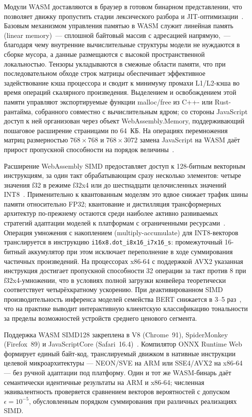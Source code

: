 Модули WASM доставляются в браузер в готовом бинарном представлении, что позволяет движку пропустить стадии лексического разбора и JIT-оптимизации~\cite{jia2024empowering}. Базовым механизмом управления памятью в WASM служит линейная память (linear memory)~— сплошной байтовый массив с адресацией напрямую,~— благодаря чему внутренние вычислительные структуры модели не нуждаются в сборке мусора, а данные размещаются с высокой пространственной локальностью. Тензоры укладываются в смежные области памяти, что при последовательном обходе строк матрицы обеспечивает эффективное задействование кэша процессора и сводит к минимуму промахи L1/L2-кэша во время операций скалярного произведения. Выделением и освобождением этой памяти управляют экспортируемые функции malloc/free из C++- или Rust-рантайма, собранного совместно с вычислительным ядром; со стороны JavaScript доступ к ней организован через объект WebAssembly.Memory, поддерживающий пошаговое расширение страницами по 64~КБ. На операциях перемножения матриц размерностью $768 \times 768$ и $768 \times 3072$ замена JavaScript на WASM даёт прирост пропускной способности на порядок величины~\cite{wang2024anatomizing}.

Расширение WebAssembly SIMD предоставляет доступ к 128-битным векторным инструкциям, за один такт обрабатывающим сразу несколько элементов: четыре значения f32 в режиме f32x4 или до шестнадцати целочисленных значений INT8~\cite{wang2024anatomizing, gholami2021quantization}. Применительно к квантованным моделям это вдвое снижает трафик шины памяти относительно FP32; квантование и дистилляция трансформерных архитектур по-прежнему остаются среди наиболее активно развиваемых стратегий адаптации моделей к платформам с ограниченными ресурсами~\cite{tang2024transformer}. Операция умножения с накоплением (multiply-accumulate) для INT8-векторов транслируется в инструкцию \texttt{i16x8.dot\_i8x16\_i7x16\_s}: промежуточный 16-битный аккумулятор при этом исключает переполнение в ходе суммирования частичных произведений. На процессорах x86-64 с поддержкой AVX2 указанная инструкция достигает пропускной способности 32 операции за такт против 8 при f32x4-умножении, что в условиях полной загрузки конвейера теоретически соответствует четырёхкратному ускорению. При деактивированном SIMD производительность инференса моделей семейства BERT снижается в 3–5 раз~\cite{jia2024empowering}, что на практике выводит интерактивную клиентскую классификацию тональности за пределы возможностей устройств среднего ценового сегмента.

Поддержка WASM SIMD128 закреплена в V8 (Chrome~91), SpiderMonkey (Firefox~89) и JavaScriptCore (Safari~16.4)~\cite{ruan2024webllm}. Компилятор ONNX Runtime Web формирует единый байт-код, транслируемый движком в нативные инструкции целевой микроархитектуры — NEON/SVE на ARM или SSE4/AVX2 на x86-64~\cite{zhang2024wasm} — без ручной адаптации под платформу. Один и тот же WASM-бинарь даёт семантически идентичные результаты на ARM и x86-64; численная эквивалентность проверяется сравнением векторов вероятностей с допуском $\epsilon = 10^{-5}$, обусловленным порядком суммирования при различных реализациях SIMD.

